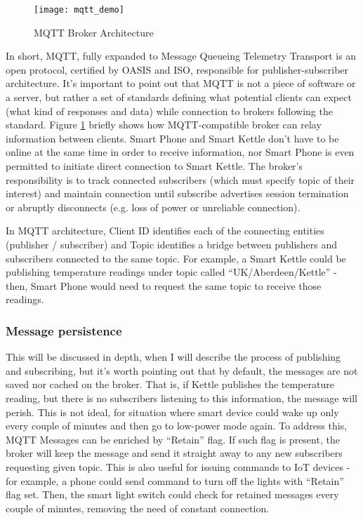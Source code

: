\begin{figure}[ht]
    \centering
    \texttt{[image: mqtt\_demo]}
    \caption{MQTT Broker Architecture}
    \label{fig:mqtt}
\end{figure}

In short, MQTT, fully expanded to Message Queueing Telemetry Transport is an open protocol, certified by OASIS and ISO\cite{banks2019mqtt}, responsible for publisher-subscriber architecture. It's important to point out that MQTT is not a piece of software or a server, but rather a set of standards defining what potential clients can expect (what kind of responses and data) while connection to brokers following the standard. Figure \ref{fig:mqtt} briefly shows how MQTT-compatible broker can relay information between clients. Smart Phone and Smart Kettle don't have to be online at the same time in order to receive information, nor Smart Phone is even permitted to initiate direct connection to Smart Kettle. The broker's responsibility is to track connected subscribers (which must specify topic of their interest) and maintain connection until subscribe advertises session termination or abruptly disconnects (e.g. loss of power or unreliable connection).

In MQTT architecture, Client ID identifies each of the connecting entities (publisher / subscriber) and Topic identifies a bridge between publishers and subscribers connected to the same topic. For example, a Smart Kettle could be publishing temperature readings under topic called ``UK/Aberdeen/Kettle'' - then, Smart Phone would need to request the same topic to receive those readings. 

\subsubsection{\textbf{Message persistence}}
This will be discussed in depth, when I will describe the process of publishing and subscribing, but it's worth pointing out that by default, the messages are not saved nor cached on the broker. That is, if Kettle publishes the temperature reading, but there is no subscribers listening to this information, the message will perish. This is not ideal, for situation where smart device could wake up only every couple of minutes and then go to low-power mode again. To address this, MQTT Messages can be enriched by ``Retain'' flag. If such flag is present, the broker will keep the message and send it straight away to any new subscribers requesting given topic. This is also useful for issuing commands to IoT devices - for example, a phone could send command to turn off the lights with ``Retain'' flag set. Then, the smart light switch could check for retained messages every couple of minutes, removing the need of constant connection.

